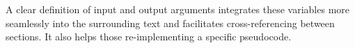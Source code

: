 


\noindent A clear definition of input and output arguments integrates these variables more seamlessly into the surrounding text and facilitates cross-referencing between sections.
It also helps those re-implementing a specific pseudocode.
